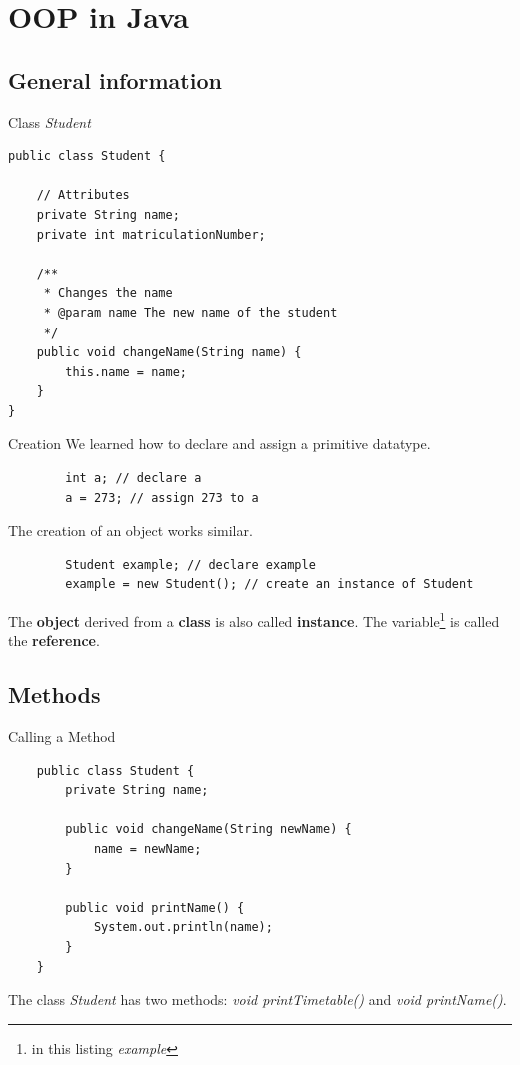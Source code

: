 \section{OOP in Java}
\subsection{General information}

\begin{frame}[fragile]{Class \emph{Student}}
\begin{lstlisting}
public class Student {

	// Attributes
	private String name; 
	private int matriculationNumber; 
	
	/**
	 * Changes the name
	 * @param name The new name of the student
	 */
	public void changeName(String name) {
		this.name = name;
	}
}
\end{lstlisting}



\end{frame}

\begin{frame}[fragile]{Creation}
	We learned how to declare and assign a primitive datatype.
	\begin{lstlisting}
	    int a; // declare a
	    a = 273; // assign 273 to a
	\end{lstlisting} 
	The creation of an object works similar.
	\begin{lstlisting}
	    Student example; // declare example
	    example = new Student(); // create an instance of Student
	\end{lstlisting}
	The \textbf{object} derived from a \textbf{class} is also called \textbf{instance}.
	The variable\footnote{in this listing \emph{example}} is called the \textbf{reference}.
\end{frame}

\subsection{Methods}
\begin{frame}[fragile]{Calling a Method}
	\begin{lstlisting}
	public class Student {
		private String name;
	
	    public void changeName(String newName) {
			name = newName;
	    }
	    
	    public void printName() {
	        System.out.println(name);
	    }
	}
	\end{lstlisting}
	The class \emph{Student} has two methods: \emph{void printTimetable()} and \emph{void printName()}.
\end{frame}

